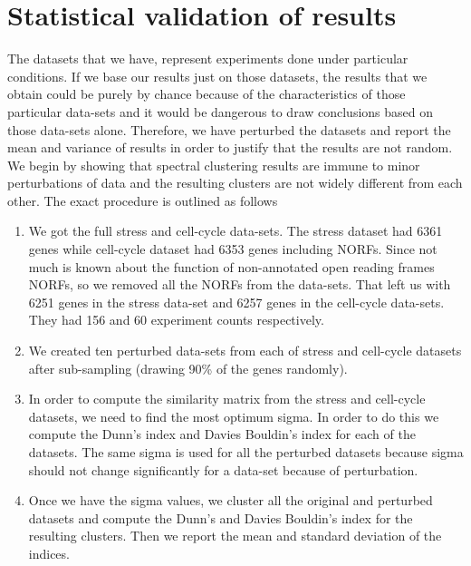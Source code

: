 \section{Statistical validation of results}
The datasets that we have, represent experiments done under particular conditions. If we base our results just on those datasets, the results that we obtain could be purely by chance because of the characteristics of those particular data-sets and it would be dangerous to draw conclusions based on those data-sets alone. 
Therefore, we have perturbed the datasets and report the mean and variance of results in order to justify that the results are not random. We begin by showing that spectral clustering results are immune to minor perturbations of data and the resulting clusters are not widely different from each other. The exact procedure is outlined as follows

\begin{enumerate}
  
\item We got the full stress and cell-cycle data-sets. The stress dataset had 6361 genes while cell-cycle dataset had 6353 genes including NORFs. Since not much is known about the function of non-annotated open reading frames NORFs, so we removed all the NORFs from the data-sets. 
That left us with 6251 genes in the stress data-set and 6257 genes in the cell-cycle data-sets. They had 156 and 60 experiment counts respectively.
 
\item We created ten perturbed data-sets from each of stress and cell-cycle datasets after sub-sampling (drawing 90\% of the genes randomly).

\item In order to compute the similarity matrix from the stress and cell-cycle datasets, we need to find the most optimum sigma. In order to do this we compute the Dunn’s index and Davies Bouldin’s index for each of the datasets. The same sigma is used for all the perturbed datasets because sigma should not change significantly for a data-set because of perturbation.

\item Once we have the sigma values, we cluster all the original and perturbed datasets and compute the Dunn's and Davies Bouldin’s index for the resulting clusters. 
Then we report the mean and standard deviation of the indices. 
\end{enumerate}

